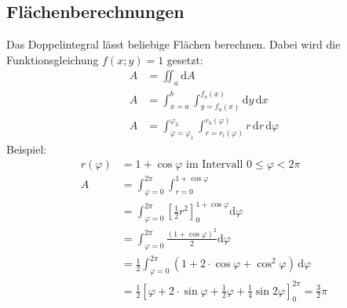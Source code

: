 \subsection{Flächenberechnungen}
Das Doppelintegral lässt beliebige Flächen berechnen. Dabei wird die Funktionsgleichung $f(x; y) = 1$ gesetzt:
\begin{align*}
	A& = \iint_a \mathrm dA\\
	A& = \int_{x=a}^b \int_{y=f_u(x)}^{f_o(x)} \mathrm dy\, \mathrm dx\\
	A& = \int_{\varphi = \varphi_1}^{\varphi_2} \int_{r=r_i(\varphi)}^{r_a(\varphi)} r\, \mathrm dr\, \mathrm d\varphi
\end{align*}
Beispiel:
\begin{align*}
	r(\varphi)& = 1 + \cos \varphi\mbox{ im Intervall } 0 \leq \varphi < 2 \pi\\
 	A & = \int_{\varphi = 0}^{2\pi}\int_{r=0}^{1 + \cos \varphi}\\
 	& = \int_{\varphi = 0}^{2\pi} \left[\frac{1}{2}r^2 \right]_0^{1 + \cos \varphi} \mathrm d\varphi\\
 	& = \int_{\varphi = 0}^{2\pi} \frac{(1 + \cos \varphi)^2}{2} \mathrm d\varphi\\
	& = \frac{1}{2} \int_{\varphi = 0}^{2\pi} (1 + 2 \cdot \cos \varphi + \cos^2 \varphi) \, \mathrm d\varphi\\
 	& = \frac{1}{2}\left[\varphi + 2 \cdot \sin \varphi + \frac{1}{2} \varphi + \frac{1}{4} \sin 2\varphi \right]_0^{2\pi} = \frac{3}{2}\pi
\end{align*}
